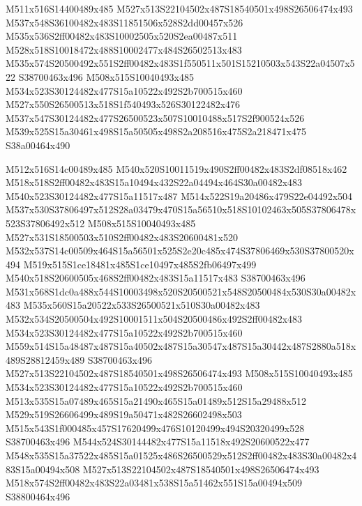 \documentclass{article}
\begin{document}
\begin{multicols}{2}
M511x516S14400489x485 M527x513S22104502x487S18540501x498S26506474x493 M537x548S36100482x483S11851506x528S2dd00457x526 M535x536S2ff00482x483S10002505x520S2ea00487x511 M528x518S10018472x488S10002477x484S26502513x483 M535x574S20500492x551S2ff00482x483S1f550511x501S15210503x543S22a04507x522 S38700463x496 M508x515S10040493x485 M534x523S30124482x477S15a10522x492S2b700515x460 M527x550S26500513x518S1f540493x526S30122482x476 M537x547S30124482x477S26500523x507S10010488x517S2f900524x526 M539x525S15a30461x498S15a50505x498S2a208516x475S2a218471x475 S38a00464x490

M512x516S14c00489x485 M540x520S10011519x490S2ff00482x483S2df08518x462 M518x518S2ff00482x483S15a10494x432S22a04494x464S30a00482x483 M540x523S30124482x477S15a11517x487 M514x522S19a20486x479S22e04492x504 M537x530S37806497x512S28a03479x470S15a56510x518S10102463x505S37806478x523S37806492x512 M508x515S10040493x485 M527x531S18500503x510S2ff00482x483S20600481x520 M532x537S14c00509x464S15a56501x525S2e20c485x474S37806469x530S37800520x494 M519x515S1ce18481x485S1ce10497x485S2fb06497x499 M540x518S20600505x468S2ff00482x483S15a11517x483 S38700463x496 M531x568S1dc0a488x544S10003498x520S20500521x548S20500484x530S30a00482x483 M535x560S15a20522x533S26500521x510S30a00482x483 M532x534S20500504x492S10001511x504S20500486x492S2ff00482x483 M534x523S30124482x477S15a10522x492S2b700515x460 M559x514S15a48487x487S15a40502x487S15a30547x487S15a30442x487S2880a518x489S28812459x489 S38700463x496 M527x513S22104502x487S18540501x498S26506474x493 M508x515S10040493x485 M534x523S30124482x477S15a10522x492S2b700515x460 M513x535S15a07489x465S15a21490x465S15a01489x512S15a29488x512 M529x519S26606499x489S19a50471x482S26602498x503 M515x543S1f000485x457S17620499x476S10120499x494S20320499x528 S38700463x496 M544x524S30144482x477S15a11518x492S20600522x477 M548x535S15a37522x485S15a01525x486S26500529x512S2ff00482x483S30a00482x483S15a00494x508 M527x513S22104502x487S18540501x498S26506474x493 M518x574S2ff00482x483S22a03481x538S15a51462x551S15a00494x509 S38800464x496


\end{multicols}
\end{document}
